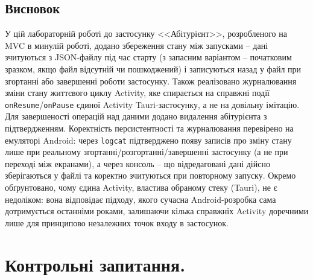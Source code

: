 \documentclass[14pt, a4paper]{extreport}
\begin{document}
	\subsection*{Висновок}

	У цій лабораторній роботі до застосунку <<Абітурієнт>>, розробленого на MVC в минулій роботі, додано збереження стану між запусками -- дані зчитуються з JSON-файлу під час старту (з запасним варіантом -- початковим зразком, якщо файл відсутній чи пошкоджений) і записуються назад у файл при згортанні або завершенні роботи застосунку. Також реалізовано журналювання зміни стану життєвого циклу Activity, яке спирається на справжні події \texttt{onResume}/\texttt{onPause} єдиної Activity Tauri-застосунку, а не на довільну імітацію. Для завершеності операцій над даними додано видалення абітурієнта з підтвердженням. Коректність персистентності та журналювання перевірено на емуляторі Android: через \texttt{logcat} підтверджено появу записів про зміну стану лише при реальному згортанні/розгортанні/завершенні застосунку (а не при переході між екранами), а через консоль -- що відредаговані дані дійсно зберігаються у файлі та коректно зчитуються при повторному запуску. Окремо обґрунтовано, чому єдина Activity, властива обраному стеку (Tauri), не є недоліком: вона відповідає підходу, якого сучасна Android-розробка сама дотримується останніми роками, залишаючи кілька справжніх Activity доречними лише для принципово незалежних точок входу в застосунок.

	\section*{Контрольні запитання.}
\end{document}
